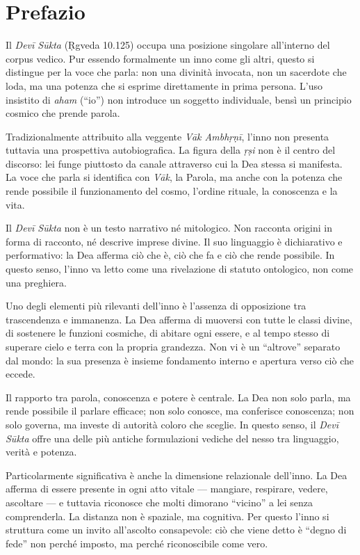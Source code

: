 \chapter*{Prefazio}

Il \textit{Devī Sūkta} (Ṛgveda 10.125) occupa una posizione singolare all’interno del corpus vedico. Pur essendo formalmente un inno come gli altri, questo si distingue per la voce che parla: non una divinità invocata, non un sacerdote che loda, ma una potenza che si esprime direttamente in prima persona. L’uso insistito di \textit{aham} (“io”) non introduce un soggetto individuale, bensì un principio cosmico che prende parola.

Tradizionalmente attribuito alla veggente \textit{Vāk Ambhṛṇī}, l’inno non presenta tuttavia una prospettiva autobiografica. La figura della \textit{ṛṣi} non è il centro del discorso: lei funge piuttosto da canale attraverso cui la Dea stessa si manifesta. La voce che parla si identifica con \textit{Vāk}, la Parola, ma anche con la potenza che rende possibile il funzionamento del cosmo, l’ordine rituale, la conoscenza e la vita.

Il \textit{Devī Sūkta} non è un testo narrativo né mitologico. Non racconta origini in forma di racconto, né descrive imprese divine. Il suo linguaggio è dichiarativo e performativo: la Dea afferma ciò che è, ciò che fa e ciò che rende possibile. In questo senso, l’inno va letto come una rivelazione di statuto ontologico, non come una preghiera.

Uno degli elementi più rilevanti dell’inno è l’assenza di opposizione tra trascendenza e immanenza. La Dea afferma di muoversi con tutte le classi divine, di sostenere le funzioni cosmiche, di abitare ogni essere, e al tempo stesso di superare cielo e terra con la propria grandezza. Non vi è un “altrove” separato dal mondo: la sua presenza è insieme fondamento interno e apertura verso ciò che eccede.

Il rapporto tra parola, conoscenza e potere è centrale. La Dea non solo parla, ma rende possibile il parlare efficace; non solo conosce, ma conferisce conoscenza; non solo governa, ma investe di autorità coloro che sceglie. In questo senso, il \textit{Devī Sūkta }offre una delle più antiche formulazioni vediche del nesso tra linguaggio, verità e potenza.

Particolarmente significativa è anche la dimensione relazionale dell’inno. La Dea afferma di essere presente in ogni atto vitale — mangiare, respirare, vedere, ascoltare — e tuttavia riconosce che molti dimorano “vicino” a lei senza comprenderla. La distanza non è spaziale, ma cognitiva. Per questo l’inno si struttura come un invito all’ascolto consapevole: ciò che viene detto è “degno di fede” non perché imposto, ma perché riconoscibile come vero.

